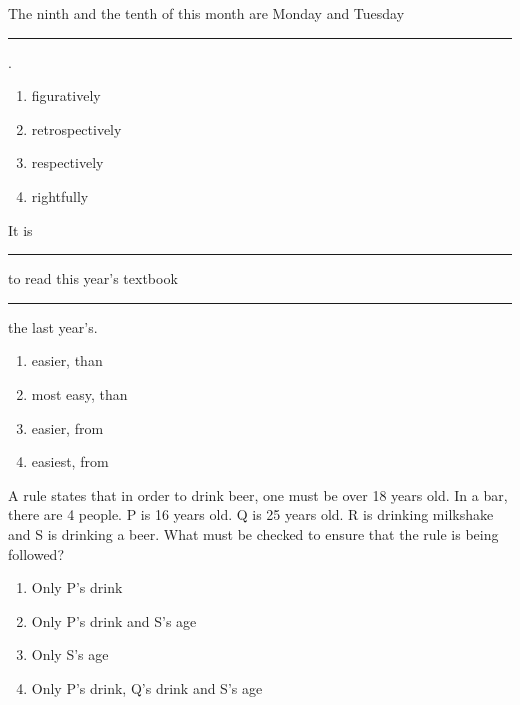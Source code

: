 \begin{center}
\end{center}
\item The ninth and the tenth of this month are Monday and Tuesday \rule{2cm}{0.15mm}.
\begin{enumerate}
    \item figuratively
    \item retrospectively
    \item respectively
    \item rightfully
\end{enumerate}
\item It is \rule{2cm}{0.15mm} to read this year's textbook\rule{2cm}{0.15mm} the last year's.
\begin{enumerate}
    \item easier, than
    \item most easy, than
    \item easier, from
    \item easiest, from
\end{enumerate}
    \item A rule states that in order to drink beer, one must be over 18 years old. In a bar, there are 4 people. P is 16 years old. Q is 25 years old. R is drinking milkshake and S is drinking a beer. What must be checked to ensure that the rule is being followed?
\begin{enumerate}
   \item Only P's drink
  \item Only P's drink and S's age
  \item Only S's age
  \item Only P's drink, Q's drink and S's age  \end{enumerate}
